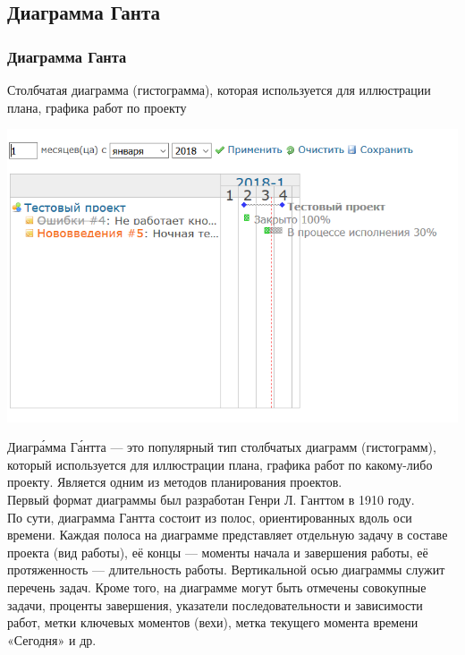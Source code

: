\documentclass{../industrial-development}
\begin{document}
\subsection{Диаграмма Ганта}
\begin{frame} \frametitle{Диаграмма Ганта}
Столбчатая диаграмма (гистограмма), которая используется для иллюстрации плана, графика работ по проекту
\centerline{\includegraphics[width=\textwidth]{gantt.png}}
\end{frame}
\lecturenotes
Диагра́мма Га́нтта — это популярный тип столбчатых диаграмм (гистограмм), который используется для иллюстрации плана, графика работ по какому-либо проекту. Является одним из методов планирования проектов.\\
Первый формат диаграммы был разработан Генри Л. Ганттом в 1910 году.\\
По сути, диаграмма Гантта состоит из полос, ориентированных вдоль оси времени. Каждая полоса на диаграмме представляет отдельную задачу в составе проекта (вид работы), её концы — моменты начала и завершения работы, её протяженность — длительность работы. Вертикальной осью диаграммы служит перечень задач. Кроме того, на диаграмме могут быть отмечены совокупные задачи, проценты завершения, указатели последовательности и зависимости работ, метки ключевых моментов (вехи), метка текущего момента времени «Сегодня» и др.
\end{document}
